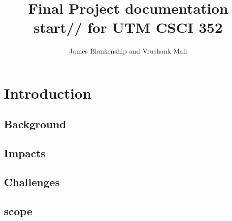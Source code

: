 \title{Final Project documentation start// for UTM CSCI 352}
%
%
\author{James Blankenship and Vrushank Mali }
\IEEEtitleabstractindextext{
\begin{abstract}

\end{abstract}
}


\maketitle 

\IEEEdisplaynontitleabstractindextext
\IEEEpeerreviewmaketitle

\section{Introduction}

\subsection{Background}
%
\subsection{Impacts}
%
%
\subsection{Challenges}
%
%
%
%
\subsection{scope}
%
%







